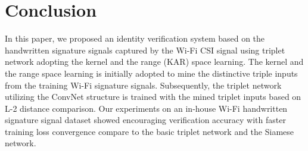 \documentclass[runningheads]{llncs}
\begin{document}
\section{Conclusion}
In this paper, we proposed an identity verification system based on the handwritten signature signals captured by the Wi-Fi CSI signal using triplet network adopting the kernel and the range (KAR) space learning. 
The kernel and the range space learning is initially adopted to mine the distinctive triple inputs from the training Wi-Fi signature signals. 
Subsequently, the triplet network utilizing the ConvNet structure is trained with the mined triplet inputs based on L-2 distance comparison. 
Our experiments on an in-house Wi-Fi handwritten signature signal dataset showed encouraging verification accuracy with faster training loss convergence compare to the basic triplet network and the Siamese network.
%
%
%
%
%
%


\clearpage



\end{document}
